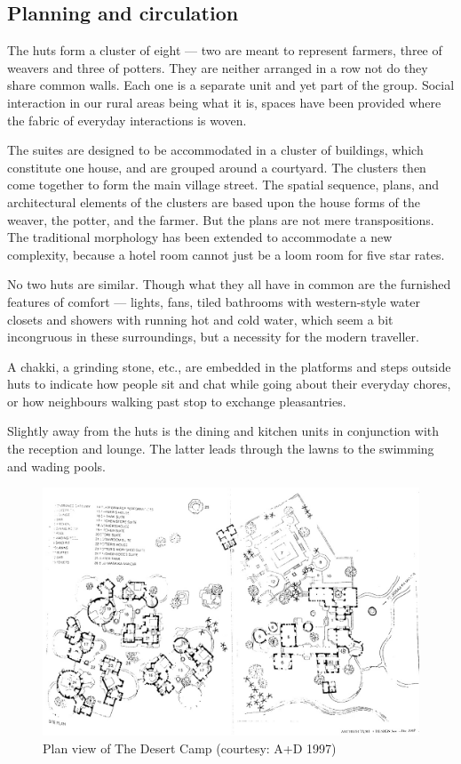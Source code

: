 
\subsection{Planning and circulation} %
\label{sub:dcm_planning}

The huts form a cluster of eight --- two are meant to represent farmers, three of weavers and three of potters. They are neither arranged in a row not do they share common walls. Each one is a separate unit and yet part of the group. Social interaction in our rural areas being what it is, spaces have been provided where the fabric of everyday interactions is woven.

The suites are designed to be accommodated in a cluster of buildings, which constitute one house, and are grouped around a courtyard. The clusters then come together to form the main village street. The spatial sequence, plans, and architectural elements of the clusters are based upon the house forms of the weaver, the potter, and the farmer. But the plans are not mere transpositions. The traditional morphology has been extended to accommodate a new complexity, because a hotel room cannot just be a loom room for five star rates.

No two huts are similar. Though what they all have in common are the furnished features of comfort --- lights, fans, tiled bathrooms with western-style water closets and showers with running hot and cold water, which seem a bit incongruous in these surroundings, but a necessity for the modern traveller.

A chakki, a grinding stone, etc., are embedded in the platforms and steps outside huts to indicate how people sit and chat while going about their everyday chores, or how neighbours walking past stop to exchange pleasantries.

Slightly away from the huts is the dining and kitchen units in conjunction with the reception and lounge. The latter leads through the lawns to the swimming and wading pools.

\begin{figure}[H]
  \centering
  \includegraphics[angle=90,width=1.0\textwidth]{img/dc-02}
  \caption{Plan view of The Desert Camp (courtesy: A+D 1997)}
  \label{fig:dc-02} 
\end{figure}

